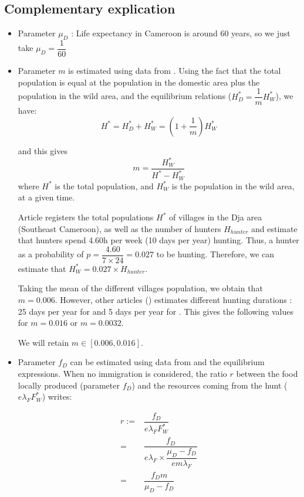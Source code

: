\documentclass{article}
\newcommand{\lfw}{\lambda_{F}}
\begin{document}
\subsection{Complementary explication}
\begin{itemize}

\item Parameter $\mu_D$ : Life expectancy in Cameroon is around 60 years, so we just take $\mu_D = \dfrac{1}{60}$

\item Parameter $m$ is estimated using data from \cite{avila_interpreting_2019, jones_incentives_2019, jones_consequences_2020}. Using the fact that the total population is equal at the population in the domestic area plus the population in the wild area, and the equilibrium relations ($H_D^* = \dfrac{1}{m}H_W^*$), we have:
$$
H^* = H_D^* + H_W^* = (1 + \dfrac{1}{m}) H_W^*
$$

and this gives
$$
m = \dfrac{H_W^*}{H^* - H_W^*}
$$
where $H^*$ is the total population, and $H_W^*$ is the population in the wild area, at a given time.

Article \cite{avila_interpreting_2019} registers the total populations $H^*$ of villages in the Dja area (Southeast Cameroon), as well as the number of hunters $H_{hunter}$ and estimate that hunters spend 4.60h per week (10 days per year) hunting. Thus, a hunter as a probability of $p = \dfrac{4.60}{7 \times 24} = 0.027$ to be hunting. Therefore, we can estimate that $H_W^* = 0.027 \times H_{hunter}$.

Taking the mean of the different villages population, we obtain that $m = 0.006$. However, other articles (\cite{jones_consequences_2020, jones_incentives_2019}) estimates different hunting durations : 25 days per year for \cite{jones_incentives_2019} and 5 days per year for \cite{jones_consequences_2020}. This gives the following values for $m = 0.016$ or $m = 0.0032$.

We will retain $m \in [0.006, 0.016]$.

\item Parameter $f_D$ can be estimated using data from \cite{koppert_consommation_1996} and the equilibrium expressions. When no immigration is considered, the ratio $r$ between the food locally produced (parameter $f_D$) and the resources coming from the hunt ($e \lfw F_W^*$) writes:

\begin{align*}
r :=&  \dfrac{f_D}{e \lfw F_W^*} \\
=& \dfrac{f_D}{e \lfw \times \dfrac{\mu_D - f_D}{e m \lfw}}\\
=& \dfrac{f_D m }{\mu_D - f_D}
\end{align*}


\end{itemize}
\end{document}
